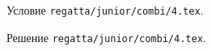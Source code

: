 \problem
Условие \texttt{regatta/junior/combi/4.tex}.

\solution Решение \texttt{regatta/junior/combi/4.tex}.
\endproblem
